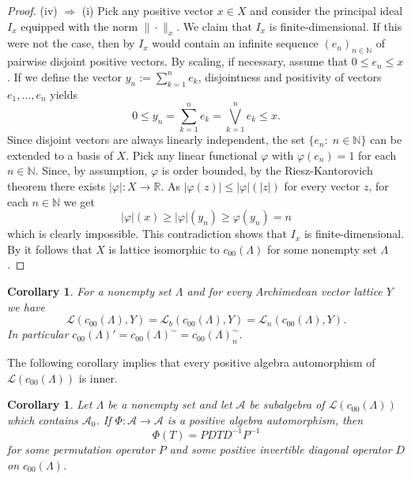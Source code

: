 \documentclass[12pt,reqno]{amsart}
\theoremstyle{plain}
\newtheorem{corollary}[theorem]{Corollary}
\theoremstyle{definition}
\newcommand{\NN}{\mathbb{N}}
\begin{document}
\begin{proof}
(iv) $\Rightarrow$ (i)
Pick any positive vector $x\in X$ and consider the principal ideal $I_x$ equipped with the norm $\|\cdot\|_x$. We claim that $I_x$ is finite-dimensional. If this were not the case, then by \cite[Theorem 26.10]{LZ71} $I_x$ would contain an infinite sequence $(e_n)_{n\in\mathbb N}$ of pairwise disjoint positive vectors. By scaling, if necessary, assume that $0\leq e_n\leq x$. If we define the vector
 $y_n:=\sum_{k=1}^n e_k$, disjointness and positivity of vectors $e_1,\ldots,e_n$ yields
 $$0\leq y_n=\sum_{k=1}^ne_k=\bigvee_{k=1}^ne_k\leq x.$$
 Since disjoint vectors are always linearly independent, the set $\{e_n:\; n\in \mathbb N\}$ can be extended to a basis of $X$. Pick any linear functional $\varphi$ with $\varphi(e_n)=1$ for each $n\in \mathbb N$. Since, by assumption, $\varphi$ is order bounded, by the Riesz-Kantorovich theorem \cite[Theorem 1.18]{Aliprantis:06} there exists $|\varphi|\colon X\to \mathbb R$. As $|\varphi(z)|\leq |\varphi|(|z|)$ for every vector $z$, for each $n\in\NN$ we get
 $$|\varphi|(x)\geq |\varphi|(y_n)\geq \varphi(y_n)=n$$
 which is clearly impossible. This contradiction shows that $I_x$ is finite-dimensional.  By \cite[Theorem 61.4]{LZ71} it follows that $X$ is lattice isomorphic to $c_{00}(\Lambda)$ for some nonempty set $\Lambda$.
\end{proof}

\begin{corollary} 
For a nonempty set $\Lambda$ and for every Archimedean vector lattice $Y$ we have
$$\mathscr L(c_{00}(\Lambda),Y)=\mathscr L_b(c_{00}(\Lambda),Y)=\mathscr L_n(c_{00}(\Lambda),Y).$$
In particular $c_{00}(\Lambda)'=c_{00}(\Lambda)^\sim=c_{00}(\Lambda)_n^\sim$.
\end{corollary}

The following corollary implies that every positive algebra automorphism of ${\mathscr L}(c_{00}(\Lambda))$ is inner.

\begin{corollary}\label{c00 version}
Let $\Lambda$ be a nonempty set and
let ${\mathscr A}$ be subalgebra of ${\mathscr L}(c_{00}(\Lambda))$ which contains $\mathscr A_0$. If $\Phi\colon \mathscr A\to \mathscr A$ is a positive algebra automorphism, then
$$\Phi(T)=PDTD^{-1}P^{-1}$$
for some permutation operator $P$ and some positive invertible diagonal operator $D$ on $c_{00}(\Lambda)$.
\end{corollary}
\end{document}
